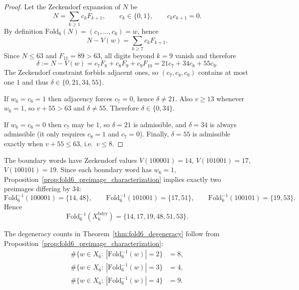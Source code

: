 \begin{proof}
Let the Zeckendorf expansion of $N$ be
\[
N=\sum_{k\ge 1} c_k F_{k+1},
\qquad
c_k\in\{0,1\},
\qquad
c_k c_{k+1}=0.
\]
By definition $\mathrm{Fold}_6(N)=(c_1,\dots,c_6)=w$, hence
\[
N-V(w)=\sum_{k\ge 7} c_k F_{k+1}.
\]
Since $N\le 63$ and $F_{11}=89>63$, all digits beyond $k=9$ vanish and therefore
\[
\delta:=N-V(w)=c_7 F_8 + c_8 F_9 + c_9 F_{10}
 = 21c_7 + 34c_8 + 55c_9.
\]
The Zeckendorf constraint forbids adjacent ones, so $(c_7,c_8,c_9)$ contains at most one $1$ and thus $\delta\in\{0,21,34,55\}$.

If $w_6=c_6=1$ then adjacency forces $c_7=0$, hence $\delta\neq 21$.
Also $v\ge 13$ whenever $w_6=1$, so $v+55>63$ and $\delta\neq 55$.
Therefore $\delta\in\{0,34\}$.

If $w_6=c_6=0$ then $c_7$ may be $1$, so $\delta=21$ is admissible, and $\delta=34$ is always admissible (it only requires $c_8=1$ and $c_7=0$).
Finally, $\delta=55$ is admissible exactly when $v+55\le 63$, i.e.\ $v\le 8$.
\end{proof}

\begin{corollary}
The boundary words have Zeckendorf values $V(100001)=14$, $V(101001)=17$, $V(100101)=19$.
Since each boundary word has $w_6=1$, Proposition~\ref{prop:fold6_preimage_characterization} implies exactly two preimages differing by $34$:
\[
\mathrm{Fold}_6^{-1}(100001)=\{14,48\},\qquad
\mathrm{Fold}_6^{-1}(101001)=\{17,51\},\qquad
\mathrm{Fold}_6^{-1}(100101)=\{19,53\}.
\]
Hence
\[
\mathrm{Fold}_6^{-1}(X_6^{\mathrm{bdry}})=\{14,17,19,48,51,53\}.
\]
\end{corollary}

\begin{corollary}
The degeneracy counts in Theorem~\ref{thm:fold6_degeneracy} follow from Proposition~\ref{prop:fold6_preimage_characterization}:
\[
\begin{aligned}
\#\{w\in X_6:\ |\mathrm{Fold}_6^{-1}(w)|=2\} &= 8,\\
\#\{w\in X_6:\ |\mathrm{Fold}_6^{-1}(w)|=3\} &= 4,\\
\#\{w\in X_6:\ |\mathrm{Fold}_6^{-1}(w)|=4\} &= 9.
\end{aligned}
\]
\end{corollary}

